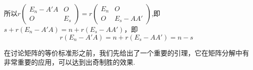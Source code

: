 \documentclass{article}
\begin{document}
所以$r \left(
    \begin{array}{cc}
            E_n - A'A & O   \\
            O         & E_s
        \end{array}
    \right)
    =
    r \left(
    \begin{array}{cc}
            E_n & O         \\
            O   & E_s - AA'
        \end{array}
    \right)$,即$s + r \left(E_n - A'A\right) = n + r \left(E_s - AA'\right)$，即
\begin{equation*}
    r \left(E_n - A'A\right) = n + r \left(E_s - AA'\right) = n - s
\end{equation*}


\vspace{2ex}

\vspace{1ex}
在讨论矩阵的等价标准形之前，我们先给出了一个重要的引理，它在矩阵分解中有非常重要的应用，可以达到出奇制胜的效果.
\end{document}
